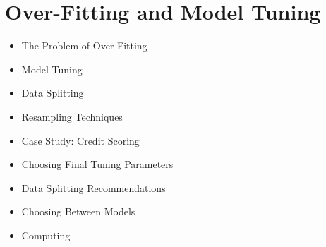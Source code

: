 \section{Over-Fitting and Model Tuning}
\begin{itemize}
\item The Problem of Over-Fitting  
\item Model Tuning 
\item Data Splitting 
\item Resampling Techniques
\item Case Study: Credit Scoring  
\item Choosing Final Tuning Parameters  
\item Data Splitting Recommendations 
\item Choosing Between Models  
\item Computing 
\end{itemize} 

